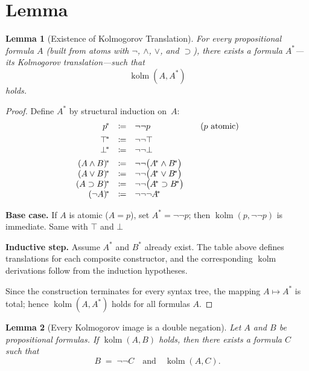 \documentclass{article}
\newtheorem{lemma}{Lemma}
\begin{document}
\section{Lemma}
\begin{lemma}[Existence of Kolmogorov Translation]\label{lem:exists-kolm}
  For every propositional formula $A$ (built from atoms with
  $\neg$, $\land$, $\lor$, and $\supset$), there exists a formula
  $A^{\!*}$—its Kolmogorov translation—such that
  \[
    \operatorname{kolm}(A,A^{\!*})
  \]
  holds.
  \end{lemma}
  
  \begin{proof}
  Define $A^{\!*}$ by structural induction on $A$:
  \[
  \begin{array}{rcl@{\qquad}l}
  p^{\!*}              &\coloneqq& \neg\neg p &(\text{$p$ atomic})\\[4pt]
  \top^{\!*}           &\coloneqq& \neg \neg \top\\
  \bot^{\!*}           &\coloneqq& \neg \neg \bot\\[4pt]
  (A \land B)^{\!*}    &\coloneqq& \neg\neg\bigl(A^{\!*}\land B^{\!*}\bigr)\\
  (A \lor  B)^{\!*}    &\coloneqq& \neg\neg\bigl(A^{\!*}\lor  B^{\!*}\bigr)\\
  (A \supset B)^{\!*}  &\coloneqq& \neg\neg\bigl(A^{\!*}\supset B^{\!*}\bigr)\\
  (\neg A)^{\!*}       &\coloneqq& \neg\neg\neg A^{\!*}
  
  \end{array}
  \]
  
  \noindent
  \textbf{Base case.}  If $A$ is atomic ($A=p$), set $A^{\!*}=\neg\neg p$; then
  $\operatorname{kolm}(p,\neg\neg p)$ is immediate. Same with $\top$ and $\bot$
  
  \smallskip
  \noindent
  \textbf{Inductive step.}  Assume $A^{\!*}$ and $B^{\!*}$ already exist.
  The table above defines translations for each composite constructor,
  and the corresponding $\operatorname{kolm}$ derivations follow from
  the induction hypotheses.
  
  \smallskip
  Since the construction terminates for every syntax tree, the
  mapping $A\mapsto A^{\!*}$ is total; hence
  $\operatorname{kolm}(A,A^{\!*})$ holds for all formulas $A$.
  \end{proof}


  \begin{lemma}[Every Kolmogorov image is a double negation]
    \label{lem:outer-dneg}
    Let $A$ and $B$ be propositional formulas.
    If \(\operatorname{kolm}(A,B)\) holds, then there exists a formula
    \(C\) such that
    \[
       B \;=\; \neg\neg C
       \quad\text{and}\quad
       \operatorname{kolm}(A,C).
    \]
    \end{lemma}
    
\end{document}
